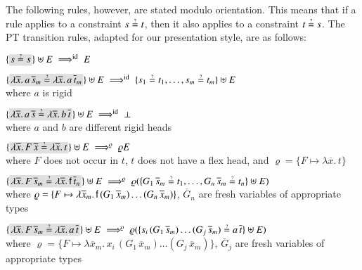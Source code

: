 The following rules, however, are stated modulo orientation. This means that 
if a rule applies to a constraint $s \unif t$, then it also applies to a constraint $t
\unif s$. The PT transition rules, adapted for our presentation style, are as
follows:

\begin{description}[labelwidth=\widthof{\rm\unifrulename{\bf Decomposition}}]
    \item[\rm\textsf{Deletion}] 
      $\{\selected{s \unif s}\} \uplus E \ptarrowid E$
    \item[\rm\textsf{Decomposition}]
      $\{\selected{\lambda \overline{x}. \, a \, \overline{s}_m \unif \lambda \overline{x}. \, a \, \overline{t}_m} \} 
        \uplus \allowbreak
        E \ptarrowid \{ s_1 \unif  t_1, \ldots, s_m \unif t_m \} \uplus E$
        \\ where $a$ is rigid
    \item[\rm\textsf{Failure}]
        $\{\selected{\lambda \overline{x}. \, a \, \overline{s} \unif \lambda \overline{x}. \, b \, \overline{t}} \} 
          \uplus \allowbreak
          E \ptarrowid \bot$
    \\ where $a$ and $b$ are different rigid heads
    \item[\rm\textsf{Solution}] 
      $\{\selected{\lambda \overline{x}.\, F\,\overline{x} \unif \lambda \overline{x}.\,t} \} \uplus E \ptarrow{\varrho} \varrho E$
      \\where $F$ does not occur in $t$, $t$ does not have a flex head, and $\varrho = \{ F \mapsto \lambda \overline{x}.\,t \}$ 
    \item[\rm\textsf{Imitation}]
      $\{\selected{\lambda \overline{x}. \, F \, \overline{s}_m \unif \lambda
      \overline{x}. \, \cst{f} \, \overline{t}_n }\} \uplus E \ptarrow{\varrho}
      \varrho(\{ G_1 \,
      \overline{s}_m  \unif  t_1, \ldots,  G_n \, \overline{s}_m \allowbreak \unif t_n\} \uplus E)$ \\
      where $\varrho = \{ F \mapsto \lambda \overline{x}_m. \, \mathsf{f} \, (G_1
      \, \overline{x}_m) \ldots (G_n \, \overline{x}_m) \}$,
      $\overline{G}_n$ are fresh variables of appropriate types
    \item[\rm\textsf{Projection}]
      $\{\selected{\lambda \overline{x}. \, F \, \overline{s}_m \unif \lambda
      \overline{x}. \, a \, \overline{t} }\} \uplus E \ptarrow{\varrho} 
      \varrho(\{ s_i \, (G_1 \,
      \overline{s}_m) \ldots (G_j \, \overline{s}_m) \unif a \, \overline{t}\} \uplus E)$ \\
      where $\varrho =\{F \mapsto \lambda \overline{x}_m. \, x_i \, (G_1 \,
      \overline{x}_m) \ldots (G_j \, \overline{x}_m)\}$, $\overline{G}_j$ are
      fresh variables of appropriate types
\end{description}
